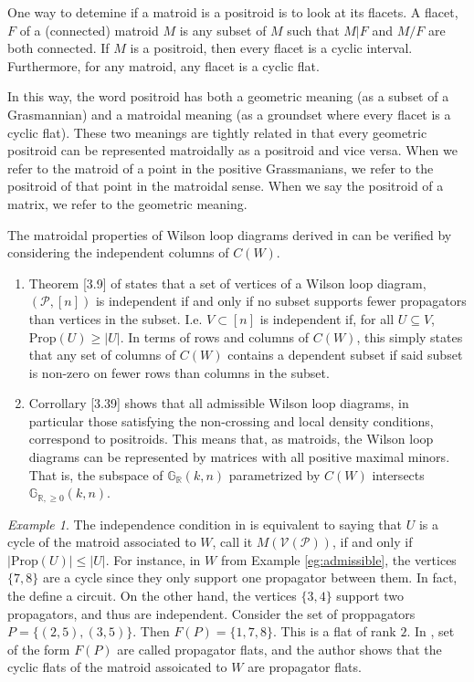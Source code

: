 \documentclass[11pt]{article}
\newcommand{\sanote}{\todo[color=violet!30]}
\newcommand{\R}{\mathbb{R}}
\newcommand{\Gr}{\mathbb{G}_{\R, \geq 0}}
\newcommand{\Grall}{\mathbb{G}_{\R}}
\newcommand{\cP}{\mathcal{P}}
\newcommand{\cV}{\mathcal{V}}
\newcommand{\VP}{\cV(\cP)}
\newcommand{\Prop}{\textrm{Prop}}
\theoremstyle{remark}
\newtheorem{eg}[thm]{Example}
\theoremstyle{definition}
\begin{document}
One way to detemine if a matroid is a positroid is to look at its flacets. A flacet, $F$ of a (connected) matroid $M$ is any subset of $M$ such that $M|F$ and $M/F$ are both connected. If $M$ is a positroid, then every flacet is a cyclic interval. Furthermore, for any matroid, any flacet is a cyclic flat.

In this way, the word positroid has both a geometric meaning (as a subset of a Grasmannian) and a matroidal meaning (as a groundset where every flacet is a cyclic flat). These two meanings are tightly related in that every geometric positroid can be represented matroidally as a positroid and vice versa. When we refer to the matroid of a point in the positive Grassmanians, we refer to the positroid of that point in the matroidal sense. When we say the positroid of a matrix, we refer to the geometric meaning. \sanote{make this clearer?}

The matroidal properties of Wilson loop diagrams derived in \cite{Wilsonloops}  can be verified by considering the independent columns of $C(W)$.
\begin{enumerate} 
\item Theorem [3.9] of \cite{wilsonloops} states that a set of vertices of a Wilson loop diagram, $(\cP, [n])$  is independent if and only if no subset supports fewer propagators than vertices in the subset. I.e. $V \subset [n]$ is independent if, for all $U \subseteq V$, $\Prop(U) \geq |U|$. In terms of rows and columns of $C(W)$, this simply states that any set of columns of $C(W)$ contains a dependent subset if said subset is non-zero on fewer rows than columns in the subset.
\item Corrollary [3.39] shows that all admissible Wilson loop diagrams, in particular those satisfying the non-crossing and local density conditions, correspond to positroids. This means that, as matroids, the Wilson loop diagrams can be represented by matrices with all positive maximal minors. That is, the subspace of $\Grall(k,n)$ parametrized by $C(W)$ intersects $\Gr(k,n)$.
\end{enumerate}


\begin{eg}\label{eg:wldmatroid}The independence condition in \cite[Theorem 3.9]{wilsonloops} is equivalent to saying that $U$ is a cycle of the matroid associated to $W$, call it $M(\VP)$, if and only if  $|\Prop (U)| \leq |U|$. For instance, in $W$  from Example \ref{eg:admissible}, the vertices $\{7,8\}$ are a cycle since they only support one propagator between them. In fact, the define a circuit. On the other hand, the vertices $\{3,4\}$ support two propagators, and thus are independent. Consider the set of proppagators $P = \{ (2, 5), (3, 5)\}$. Then $F(P) = \{ 1, 7, 8\}$. This is a flat of rank $2$. In \cite{wilsonloops}, set of the form $F(P)$ are called propagator flats, and the author shows that the cyclic flats of the matroid assoicated to $W$ are propagator flats.
 \end{eg}
\end{document}
